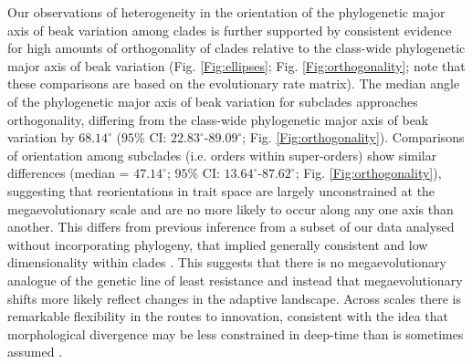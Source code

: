 \documentclass[12pt,letterpaper]{article}
\begin{document}
Our observations of heterogeneity in the orientation of the phylogenetic major axis of beak variation among clades is further supported by consistent evidence for high amounts of orthogonality of clades relative to the class-wide phylogenetic major axis of beak variation (Fig. \ref{Fig:ellipses}; Fig. \ref{Fig:orthogonality}; note that these comparisons are based on the evolutionary rate matrix). %
The median angle of the phylogenetic major axis of beak variation for subclades approaches orthogonality, differing from the class-wide phylogenetic major axis of beak variation by $68.14^\circ$ ($95$\% CI: $22.83^\circ$-$89.09^\circ$; Fig. \ref{Fig:orthogonality}).
Comparisons of orientation among subclades (i.e. orders within super-orders) show similar differences (median = $47.14^\circ$; $95$\% CI: $13.64^\circ$-$87.62^\circ$; Fig. \ref{Fig:orthogonality}), suggesting that reorientations in trait space are largely unconstrained at the megaevolutionary scale and are no more likely to occur along any one axis than another. 
This differs from previous inference from a subset of our data analysed  without incorporating phylogeny, that implied generally consistent and low dimensionality within clades \cite{cooney2017mega}.
This suggests that there is no megaevolutionary analogue of the genetic line of least resistance and instead that megaevolutionary shifts more likely reflect changes in the adaptive landscape.
Across scales there is remarkable flexibility in the routes to innovation, consistent with the idea that morphological divergence may be less constrained in deep-time than is sometimes assumed \cite{venditti2011multiple}. %
\end{document}
